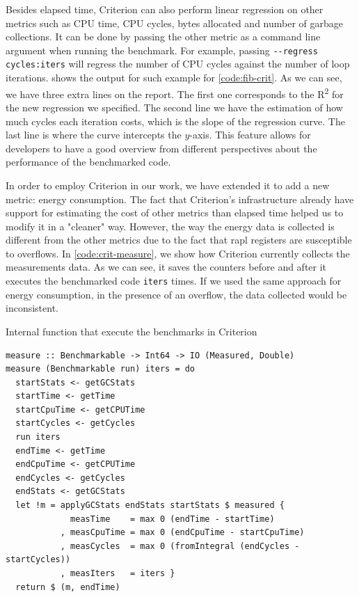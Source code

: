 Besides elapsed time, Criterion can also perform linear regression on other metrics such as CPU time, CPU cycles, bytes allocated and number of garbage collections. It can be done by passing the other metric as a command line argument when running the benchmark. For example, passing \texttt{-{}-regress cycles:iters} will regress the number of CPU cycles against the number of loop iterations.  shows the output for such example for \autoref{code:fib-crit}. As we can see, we have three extra lines on the report. The first one corresponds to the R\textsuperscript{2} for the new regression we specified. The second line we have the estimation of how much cycles each iteration costs, which is the slope of the regression curve. The last line is where the curve intercepts the $y$-axis. This feature allows for developers to have a good overview from different perspectives about the performance of the benchmarked code.

In order to employ Criterion in our work, we have extended it to add a new metric: energy consumption. The fact that Criterion's infrastructure already have support for estimating the cost of other metrics than elapsed time helped us to modify it in a "cleaner" way. However, the way the energy data is collected is different from the other metrics due to the fact that \ac{rapl} registers are susceptible to overflows. In \autoref{code:crit-measure}, we show how Criterion currently collects the measurements data. As we can see, it saves the counters before and after it executes the benchmarked code \texttt{iters} times. If we used the same approach for energy consumption, in the presence of an overflow, the data collected would be inconsistent.

\begin{listing}
  \caption{Internal function that execute the benchmarks in Criterion}
  \begin{verbatim}
measure :: Benchmarkable -> Int64 -> IO (Measured, Double)
measure (Benchmarkable run) iters = do
  startStats <- getGCStats
  startTime <- getTime
  startCpuTime <- getCPUTime
  startCycles <- getCycles
  run iters
  endTime <- getTime
  endCpuTime <- getCPUTime
  endCycles <- getCycles
  endStats <- getGCStats
  let !m = applyGCStats endStats startStats $ measured {
             measTime    = max 0 (endTime - startTime)
           , measCpuTime = max 0 (endCpuTime - startCpuTime)
           , measCycles  = max 0 (fromIntegral (endCycles - startCycles))
           , measIters   = iters }
  return $ (m, endTime)
  \end{verbatim}
  \label{code:crit-measure}
\end{listing}

